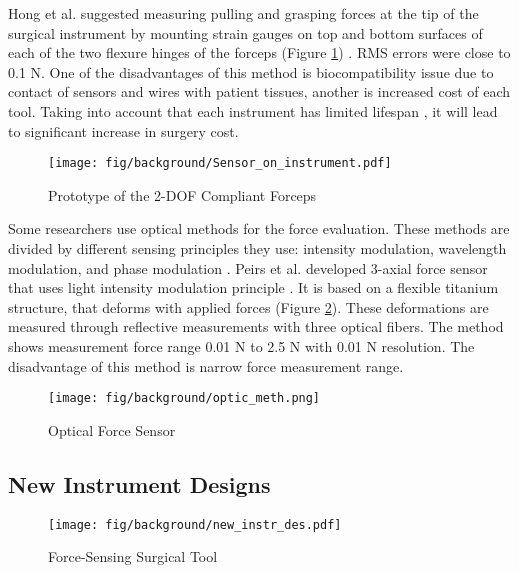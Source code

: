 Hong et al. suggested measuring pulling and grasping forces at the tip of the surgical instrument by mounting strain gauges on top and bottom surfaces of each of the two flexure hinges of the forceps (Figure \ref{fig:integr_sen}) \cite{hong_design_2012}. RMS errors were close to 0.1 N. One of the disadvantages of this method is biocompatibility issue due to contact of sensors and wires with patient tissues, another is increased cost of each tool. Taking into account that each instrument has limited lifespan \cite{ho_health_2011}, it will lead to significant increase in surgery cost.

\begin{figure}[h]
	\begin{center}
	\texttt{[image: fig/background/Sensor\_on\_instrument.pdf]}
	\end{center}
	\vspace{-4mm}
	\caption[Prototype of the 2-DOF Compliant Forceps]
	{Prototype of the 2-DOF Compliant Forceps \cite{hong_design_2012}}
	\label{fig:integr_sen}
	\vspace{-2mm}
\end{figure}

Some researchers use optical methods for the force evaluation. These methods are divided by different sensing principles they use: intensity modulation, wavelength modulation, and phase modulation \cite{su_fiber_optic_2017}. Peirs et al. developed 3-axial force sensor that uses light intensity modulation principle \cite{_micro_2004}. It is based on a flexible titanium structure, that deforms with applied forces (Figure \ref{fig:opt_sen}). These deformations are measured through reflective measurements with three optical fibers. The method shows measurement force range 0.01 N to 2.5 N with 0.01 N resolution. The disadvantage of this method is narrow force measurement range.

\begin{figure}[h]
	\begin{center}
	\texttt{[image: fig/background/optic\_meth.png]}
	\end{center}
	\vspace{-4mm}
	\caption[Optical Force Sensor]
	{Optical Force Sensor \cite{_micro_2004}}
	\label{fig:opt_sen}
	\vspace{-2mm}
\end{figure}

\subsection{New Instrument Designs}
\begin{figure}[h]
	\begin{center}
	\texttt{[image: fig/background/new\_instr\_des.pdf]}
	\end{center}
	\vspace{-4mm}
	\caption[Force-Sensing Surgical Tool]
	{ Force-Sensing Surgical Tool \cite{schwalb_forcesensing_2017}}
	\label{fig:force_sen_tool}
	\vspace{-2mm}
\end{figure}

